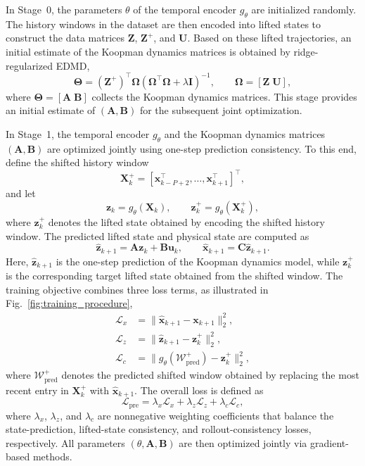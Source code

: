 \documentclass[journal]{IEEEtran}
\newcommand{\vx}{\mathbf{x}}
\newcommand{\vu}{\mathbf{u}}
\newcommand{\vz}{\mathbf{z}}
\newcommand{\mA}{\mathbf{A}}
\newcommand{\mB}{\mathbf{B}}
\newcommand{\mC}{\mathbf{C}}
\newcommand{\mX}{\mathbf{X}}
\newcommand{\mZ}{\mathbf{Z}}
\newcommand{\mU}{\mathbf{U}}
\newcommand{\mI}{\mathbf{I}}
\newcommand{\mTheta}{\boldsymbol{\Theta}}
\newcommand{\mOmega}{\boldsymbol{\Omega}}
\begin{document}
In Stage~0, the parameters $\theta$ of the temporal encoder $g_\theta$ are initialized randomly. The history windows in the dataset are then encoded into lifted states to construct the data matrices $\mZ$, $\mZ^{+}$, and $\mU$. Based on these lifted trajectories, an initial estimate of the Koopman dynamics matrices is obtained by ridge-regularized EDMD,
\begin{equation}
    \mTheta = (\mZ^{+})^\top \mOmega
    \left(\mOmega^\top \mOmega + \lambda \mI\right)^{-1},
    \qquad
    \mOmega = [\mZ\;\mU],
    \label{eq:edmd_solution}
\end{equation}
where $\mTheta = [\mA\;\mB]$ collects the Koopman dynamics matrices. This stage provides an initial estimate of $(\mA,\mB)$ for the subsequent joint optimization.

In Stage~1, the temporal encoder $g_\theta$ and the Koopman dynamics matrices $(\mA,\mB)$ are optimized jointly using one-step prediction consistency. To this end, define the shifted history window
\begin{equation}
    \mX_k^{+} = [\vx_{k-P+2}^\top,\ldots,\vx_{k+1}^\top]^\top,
\end{equation}
and let
\begin{equation}
    \vz_k = g_\theta(\mX_k), \qquad
    \vz_k^{+} = g_\theta(\mX_k^{+}),
\end{equation}
where $\vz_k^{+}$ denotes the lifted state obtained by encoding the shifted history window. The predicted lifted state and physical state are computed as
\begin{equation}
    \hat{\vz}_{k+1} = \mA \vz_k + \mB \vu_k,
    \qquad
    \hat{\vx}_{k+1} = \mC \hat{\vz}_{k+1}.
\end{equation}
Here, $\hat{\vz}_{k+1}$ is the one-step prediction of the Koopman dynamics model, while $\vz_k^{+}$ is the corresponding target lifted state obtained from the shifted window. The training objective combines three loss terms, as illustrated in Fig.~\ref{fig:training_procedure},
\begin{align}
    \mathcal{L}_{x} &= \|\hat{\vx}_{k+1}-\vx_{k+1}\|_2^2,
    \label{eq:loss_x}\\
    \mathcal{L}_{z} &= \|\hat{\vz}_{k+1}-\vz_k^{+}\|_2^2,
    \label{eq:loss_z}\\
    \mathcal{L}_{c} &=
    \bigl\|g_\theta(\mathcal{W}^{+}_{\mathrm{pred}})-\vz_k^{+}\bigr\|_2^2,
    \label{eq:loss_c}
\end{align}
where $\mathcal{W}^{+}_{\mathrm{pred}}$ denotes the predicted shifted window obtained by replacing the most recent entry in $\mX_k^{+}$ with $\hat{\vx}_{k+1}$. The overall loss is defined as
\begin{equation}
    \mathcal{L}_{\mathrm{pre}} =
    \lambda_x \mathcal{L}_x + \lambda_z \mathcal{L}_z
    + \lambda_c \mathcal{L}_c,
    \label{eq:pretraining_loss}
\end{equation}
where $\lambda_x$, $\lambda_z$, and $\lambda_c$ are nonnegative weighting coefficients that balance the state-prediction, lifted-state consistency, and rollout-consistency losses, respectively. All parameters $(\theta, \mA, \mB)$ are then optimized jointly via gradient-based methods.
\end{document}
